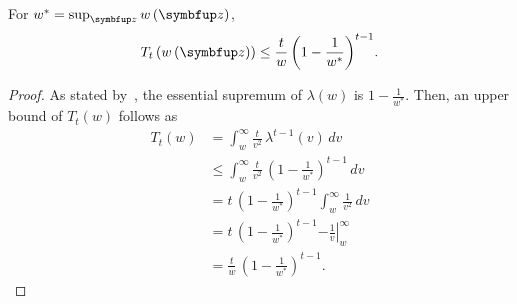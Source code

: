 
\begin{lemma}\label{thm:tn_bound}
  For \(w^* = \sup_{\vz} w\left(\vz\right) \), 
  \[
  T_t\left( w\left(\vz\right) \right) \leq \frac{t}{w} \, {\left(1 - \frac{1}{w^*}\right)}^{t-1}.
  \]
\end{lemma}
\begin{proof}
  As stated by~\citet{Smith96exacttransition}, the essential supremum of \(\lambda\left(w\right)\) is \(1 - \frac{1}{w^*}\).
  Then, an upper bound of \(T_t\left(w\right)\) follows as
  \begin{align}
    T_t\left(w\right) 
    &= \int_w^{\infty} \frac{t}{v^2} \, \lambda^{t-1}\left(v\right)\,dv \\
    &\leq \int_w^{\infty} \frac{t}{v^2} \, {\left(1 - \frac{1}{w^*}\right)}^{t-1}\,dv \\
    &= t \, {\left(1 - \frac{1}{w^*}\right)}^{t-1}  \int_w^{\infty} \frac{1}{v^2} \,dv \\
    &= t \, {\left(1 - \frac{1}{w^*}\right)}^{t-1}  {-\left.\frac{1}{v}\right\rvert^{\infty}_{w}} \\
    &= \frac{t}{w} \, {\left(1 - \frac{1}{w^*}\right)}^{t-1}.
  \end{align}
\end{proof}

